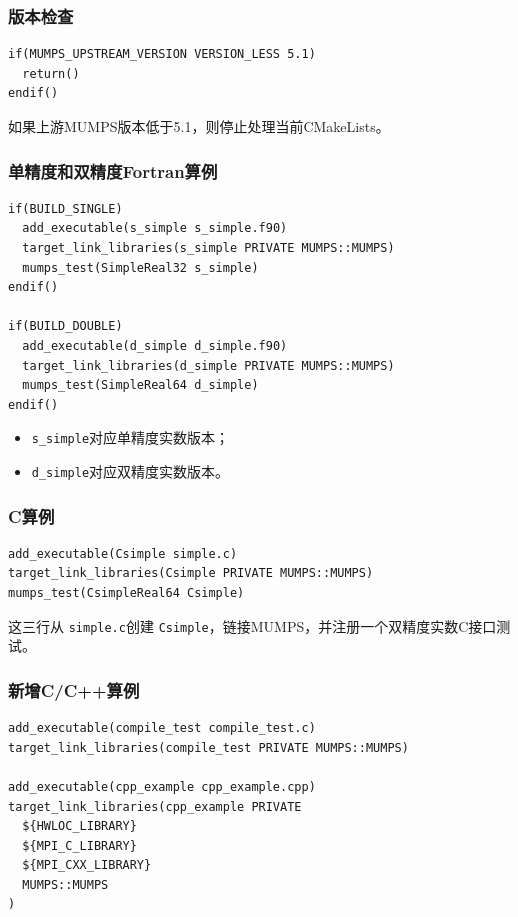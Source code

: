 \subsubsection{版本检查}

\begin{lstlisting}
if(MUMPS_UPSTREAM_VERSION VERSION_LESS 5.1)
  return()
endif()
\end{lstlisting}

如果上游MUMPS版本低于5.1，则停止处理当前CMakeLists。

\subsubsection{单精度和双精度Fortran算例}

\begin{lstlisting}
if(BUILD_SINGLE)
  add_executable(s_simple s_simple.f90)
  target_link_libraries(s_simple PRIVATE MUMPS::MUMPS)
  mumps_test(SimpleReal32 s_simple)
endif()

if(BUILD_DOUBLE)
  add_executable(d_simple d_simple.f90)
  target_link_libraries(d_simple PRIVATE MUMPS::MUMPS)
  mumps_test(SimpleReal64 d_simple)
endif()
\end{lstlisting}

\begin{itemize}
  \item \texttt{s\_simple}对应单精度实数版本；
  \item \texttt{d\_simple}对应双精度实数版本。
\end{itemize}

\subsubsection{C算例}

\begin{lstlisting}
add_executable(Csimple simple.c)
target_link_libraries(Csimple PRIVATE MUMPS::MUMPS)
mumps_test(CsimpleReal64 Csimple)
\end{lstlisting}

这三行从 \texttt{simple.c}创建 \texttt{Csimple}，链接MUMPS，并注册一个双精度实数C接口测试。

\subsubsection{新增C/C++算例}

\begin{lstlisting}
add_executable(compile_test compile_test.c)
target_link_libraries(compile_test PRIVATE MUMPS::MUMPS)

add_executable(cpp_example cpp_example.cpp)
target_link_libraries(cpp_example PRIVATE
  ${HWLOC_LIBRARY}
  ${MPI_C_LIBRARY}
  ${MPI_CXX_LIBRARY}
  MUMPS::MUMPS
)
\end{lstlisting}


